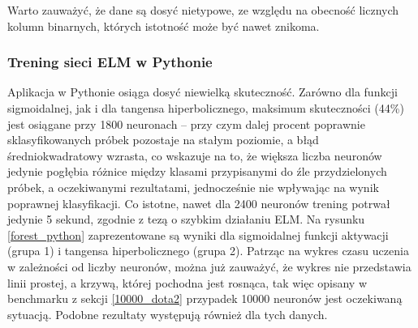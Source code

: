 \documentclass{article}
\begin{document}
Warto zauważyć, że dane są dosyć nietypowe, ze względu na obecność licznych kolumn binarnych, których istotność może być nawet znikoma.
\subsubsection{Trening sieci ELM w Pythonie}
Aplikacja w Pythonie osiąga dosyć niewielką skuteczność. Zarówno dla funkcji sigmoidalnej, jak i dla tangensa hiperbolicznego, maksimum skuteczności (44\%) jest osiągane przy 1800 neuronach -- przy czym dalej procent poprawnie sklasyfikowanych próbek pozostaje na stałym poziomie, a błąd średniokwadratowy wzrasta, co wskazuje na to, że większa liczba neuronów jedynie pogłębia różnice między klasami przypisanymi do źle przydzielonych próbek, a oczekiwanymi rezultatami, jednocześnie nie wpływając na wynik poprawnej klasyfikacji. Co istotne, nawet dla 2400 neuronów trening potrwał jedynie 5 sekund, zgodnie z tezą o szybkim działaniu ELM. 
Na rysunku \ref{forest_python} zaprezentowane są wyniki dla sigmoidalnej funkcji aktywacji (grupa 1) i tangensa hiperbolicznego (grupa 2). Patrząc na wykres czasu uczenia w zależności od liczby neuronów, można już zauważyć, że wykres nie przedstawia linii prostej, a krzywą, której pochodna jest rosnąca, tak więc opisany w benchmarku z sekcji \ref{10000_dota2} przypadek 10000 neuronów jest oczekiwaną sytuacją. Podobne rezultaty występują również dla tych danych.
\end{document}
